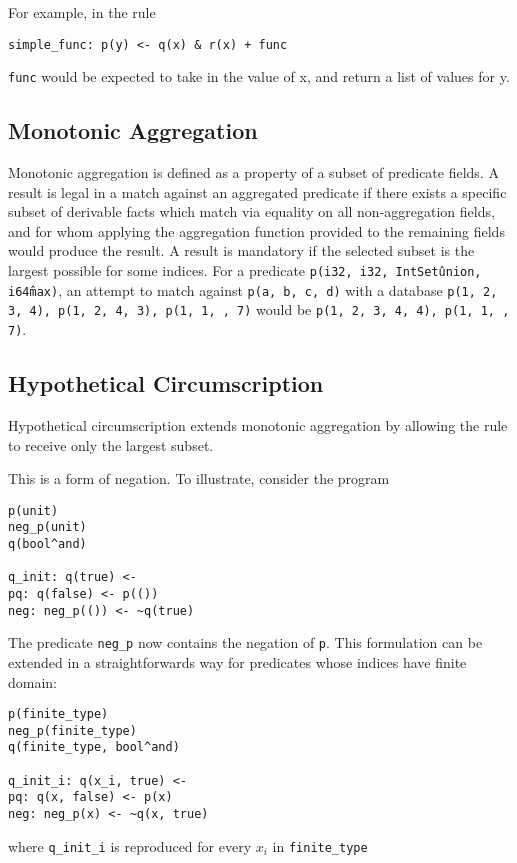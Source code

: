 For example, in the rule
\begin{verbatim}
simple_func: p(y) <- q(x) & r(x) + func
\end{verbatim}
\texttt{func} would be expected to take in the value of x, and return a list of values for y.

\subsection{Monotonic Aggregation}
Monotonic aggregation is defined as a property of a subset of predicate fields.
A result is legal in a match against an aggregated predicate if there exists a specific subset of derivable facts which match via equality on all non-aggregation fields, and for whom applying the aggregation function provided to the remaining fields would produce the result.
A result is mandatory if the selected subset is the largest possible for some indices.
For a predicate \texttt{p(i32, i32, IntSet\^union, i64\^max)}, an attempt to match against \texttt{p(a, b, c, d)} with a database \texttt{p(1, 2, {3}, 4), p(1, 2, {4}, 3), p(1, 1, {}, 7)} would be \texttt{p(1, 2, {3, 4}, 4), p(1, 1, {}, 7)}.

\subsection{Hypothetical Circumscription}
Hypothetical circumscription extends monotonic aggregation by allowing the rule to receive only the largest subset.

This is a form of negation.
To illustrate, consider the program
\begin{verbatim}
p(unit)
neg_p(unit)
q(bool^and)

q_init: q(true) <-
pq: q(false) <- p(())
neg: neg_p(()) <- ~q(true)
\end{verbatim}

The predicate \texttt{neg_p} now contains the negation of \texttt{p}.
This formulation can be extended in a straightforwards way for predicates whose indices have finite domain:

\begin{verbatim}
p(finite_type)
neg_p(finite_type)
q(finite_type, bool^and)

q_init_i: q(x_i, true) <- 
pq: q(x, false) <- p(x)
neg: neg_p(x) <- ~q(x, true)
\end{verbatim}
where \texttt{q_init_i} is reproduced for every $x_i$ in \texttt{finite_type}

